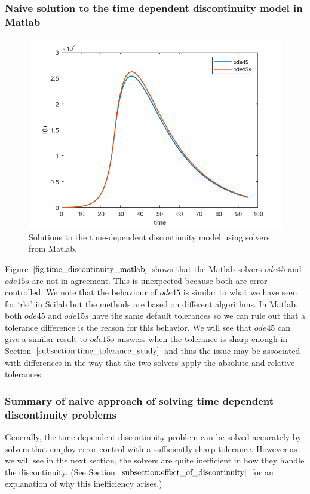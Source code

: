 \subsubsection{Naive solution to the time dependent discontinuity model in Matlab}
\begin{figure}[H]
\centering
\includegraphics[width=0.7\linewidth]{./figures/time_discontinuity_matlab}
\caption{Solutions to the time-dependent discontinuity model using solvers from Matlab.}
\label{fig:time_discontinuity_matlab}
\end{figure}
Figure $\ref{fig:time_discontinuity_matlab}$ shows that the Matlab solvers $ode45$ and $ode15s$ are not in agreement. This is unexpected because both are error controlled. We note that the behaviour of $ode45$ is similar to what we have seen for `rkf' in Scilab but the methods are based on different algorithms. In Matlab, both $ode45$ and $ode15s$ have the same default tolerances so we can rule out that a tolerance difference is the reason for this behavior. We will see that $ode45$ can give a similar result to $ode15s$ answers when the tolerance is sharp enough in Section $\ref{subsection:time_tolerance_study}$ and thus the issue may be associated with differences in the way that the two solvers apply the absolute and relative tolerances.

\subsubsection{Summary of naive approach of solving time dependent discontinuity problems}
Generally, the time dependent discontinuity problem can be solved accurately by solvers that employ error control with a sufficiently sharp tolerance. However as we will see in the next section, the solvers are quite inefficient in how they handle the discontinuity. (See Section $\ref{subsection:effect_of_discontinuity}$ for an explanation of why this inefficiency arises.)

